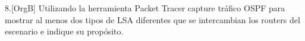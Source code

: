 \begin{ejer}
8.[OrgB] Utilizando la herramienta Packet Tracer capture tráfico OSPF para mostrar al menos dos tipos de LSA diferentes que se intercambian los routers del escenario e indique su propósito.
\end{ejer}